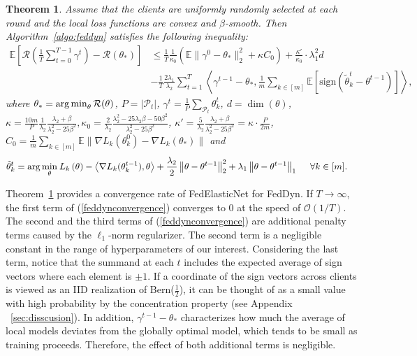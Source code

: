 \documentclass{article} %
\newtheorem{theorem}{Theorem}[section]
\begin{document}
\begin{theorem}\label{feddyntheorem}
Assume that the clients are uniformly randomly selected at each round and the local loss functions are convex and $\beta$-smooth. Then Algorithm~\ref{algo:feddyn} satisfies the following inequality:
\begin{align}
    \label{feddynconvergence}
    \mathbb{E}\left[\mathcal{R} \left(\frac{1}{T}\sum_{t=0}^{T-1}\gamma^t \right)-\mathcal{R}(\theta_*)\right]&\nonumber\le
    \frac{1}{T}\frac{1}{\kappa_0}(\mathbb{E}\lVert  \gamma^{0}-\theta_* \rVert^2_2 +\kappa C_{0})+\frac{\kappa'}{\kappa_0} \cdot \lambda_1^2d\\
    &-\frac{1}{T}\frac{2\lambda_1}{\lambda_2}\sum_{t=1}^T \left\langle {\gamma^{t-1}-\theta_*} ,\frac{1}{m}\sum_{k\in [m]}\mathbb{E}[\mathrm{sign}(\tilde{\theta}_k^t-\theta^{t-1})]\right\rangle,
\end{align}
where $\theta_*=\operatorname*{arg\,min}_\theta \mathcal{R}(\theta)$, $P=|\mathcal{P}_t|$, $\gamma^t=\frac{1}{P}\sum_{\mathcal{P}_t}\theta_k^t$, $d=\dim(\theta)$, $\kappa=\frac{10m}{P}\frac{1}{\lambda_2}\frac{\lambda_2+\beta}{\lambda_2^2-25\beta^2}, \kappa_0=\frac{2}{\lambda_2}\frac{\lambda_2^2-25\lambda_2\beta-50\beta^2}{\lambda_2^2-25\beta^2}$, $\kappa' = \frac{5}{\lambda_2}\frac{\lambda_2+\beta}{\lambda_2^2-25\beta^2} = \kappa \cdot \frac{P}{2m}$, $C_0 =\frac{1}{m}\sum_{k\in[m]}\mathbb{E}\lVert\nabla L_k(\theta_k^0)-\nabla L_k(\theta_*)\rVert$ and 
\begin{align*}    
    \Tilde{\theta}_k^t &= \arg\underset{\theta}\min \: L_{k}\left ( \theta \right ) - \left< \nabla L_{k} (\theta_k^{t-1}), \theta\right> + \frac{\lambda_2}{2} \left\| \theta - \theta^{t-1}\right\|^{2}_{2}+ \lambda_1\left\|\theta - \theta^{t-1} \right\|_{1} ~~~~ \forall k \in [m]. 
\end{align*}
\end{theorem}
Theorem~\ref{feddyntheorem} provides a convergence rate of FedElasticNet for FedDyn. If $T \to \infty$, the first term of (\ref{feddynconvergence}) converges to 0 at the speed of $\mathcal{O}(1/T)$. The second and the third terms of (\ref{feddynconvergence}) are additional penalty terms caused by the $\ell_1$-norm regularizer. The second term is a negligible constant in the range of hyperparameters of our interest. Considering the last term, notice that the summand at each $t$ includes the expected average of sign vectors where each element is $\pm 1$. If a coordinate of the sign vectors across clients is viewed as an IID realization of Bern($\frac{1}{2}$), it can be thought of as a small value with high probability by the concentration property (see Appendix ~\ref{sec:disscusion}). In addition, $\gamma^{t-1}-\theta_*$ characterizes how much the average of local models deviates from the globally optimal model, which tends to be small as training proceeds. Therefore, the effect of both additional terms is negligible.%
\end{document}
